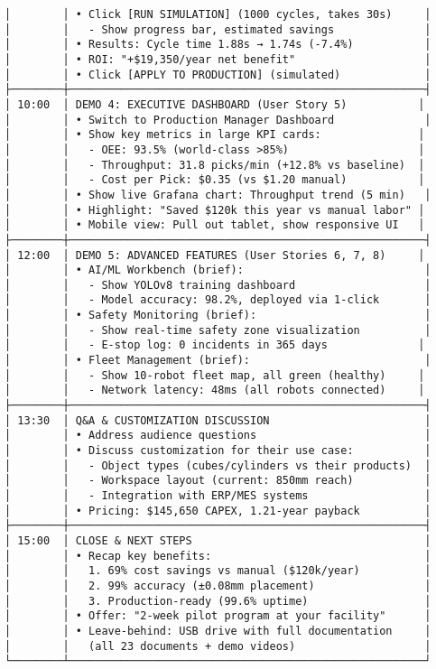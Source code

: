 \documentclass[
]{article}
\begin{document}
\begin{verbatim}
│        │ • Click [RUN SIMULATION] (1000 cycles, takes 30s)     │
│        │   - Show progress bar, estimated savings              │
│        │ • Results: Cycle time 1.88s → 1.74s (-7.4%)           │
│        │ • ROI: "+$19,350/year net benefit"                    │
│        │ • Click [APPLY TO PRODUCTION] (simulated)             │
├────────┼───────────────────────────────────────────────────────┤
│ 10:00  │ DEMO 4: EXECUTIVE DASHBOARD (User Story 5)           │
│        │ • Switch to Production Manager Dashboard              │
│        │ • Show key metrics in large KPI cards:               │
│        │   - OEE: 93.5% (world-class >85%)                    │
│        │   - Throughput: 31.8 picks/min (+12.8% vs baseline)  │
│        │   - Cost per Pick: $0.35 (vs $1.20 manual)           │
│        │ • Show live Grafana chart: Throughput trend (5 min)   │
│        │ • Highlight: "Saved $120k this year vs manual labor" │
│        │ • Mobile view: Pull out tablet, show responsive UI   │
├────────┼───────────────────────────────────────────────────────┤
│ 12:00  │ DEMO 5: ADVANCED FEATURES (User Stories 6, 7, 8)     │
│        │ • AI/ML Workbench (brief):                            │
│        │   - Show YOLOv8 training dashboard                    │
│        │   - Model accuracy: 98.2%, deployed via 1-click       │
│        │ • Safety Monitoring (brief):                          │
│        │   - Show real-time safety zone visualization          │
│        │   - E-stop log: 0 incidents in 365 days              │
│        │ • Fleet Management (brief):                           │
│        │   - Show 10-robot fleet map, all green (healthy)     │
│        │   - Network latency: 48ms (all robots connected)     │
├────────┼───────────────────────────────────────────────────────┤
│ 13:30  │ Q&A & CUSTOMIZATION DISCUSSION                        │
│        │ • Address audience questions                          │
│        │ • Discuss customization for their use case:           │
│        │   - Object types (cubes/cylinders vs their products)  │
│        │   - Workspace layout (current: 850mm reach)           │
│        │   - Integration with ERP/MES systems                  │
│        │ • Pricing: $145,650 CAPEX, 1.21-year payback          │
├────────┼───────────────────────────────────────────────────────┤
│ 15:00  │ CLOSE & NEXT STEPS                                    │
│        │ • Recap key benefits:                                 │
│        │   1. 69% cost savings vs manual ($120k/year)          │
│        │   2. 99% accuracy (±0.08mm placement)                 │
│        │   3. Production-ready (99.6% uptime)                  │
│        │ • Offer: "2-week pilot program at your facility"      │
│        │ • Leave-behind: USB drive with full documentation     │
│        │   (all 23 documents + demo videos)                    │
└────────┴───────────────────────────────────────────────────────┘
\end{verbatim}
\end{document}
